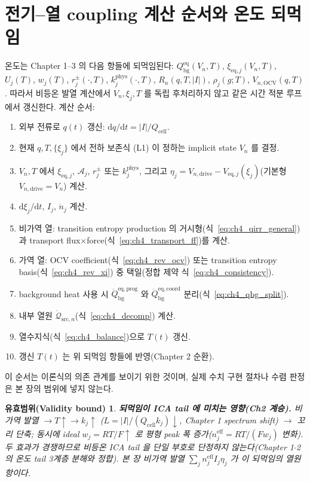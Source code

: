 \documentclass[11pt,a4paper]{article}
\newtheorem*{boundbox}{유효범위(Validity bound)}
\newcommand{\dd}{\mathrm{d}}
\newcommand{\eff}{\mathrm{eff}}
\newcommand{\eq}{\mathrm{eq}}
\newcommand{\drive}{\mathrm{drive}}
\newcommand{\bg}{\mathrm{bg}}
\newcommand{\cell}{\mathrm{cell}}
\newcommand{\OCV}{\mathrm{OCV}}
\newcommand{\src}{\mathrm{src}}
\newcommand{\prog}{\mathrm{prog}}
\newcommand{\coord}{\mathrm{coord}}
\begin{document}
\section{전기--열 coupling 계산 순서와 온도 되먹임}\label{sec:ch4_order}
온도는 Chapter 1--3 의 다음 항들에 되먹임된다: $Q_\bg^{\eq}(V_n,T)$, $\xi_{\eq,j}(V_n,T)$, $U_j(T)$, $w_j(T)$,
$r_j^\pm(\cdot,T)$, $k_j^{\mathrm{phys}}(\cdot,T)$, $R_n(q,T,|I|)$, $\rho_j(g;T)$, $V_{n,\OCV}(q,T)$. 따라서
비등온 발열 계산에서 $V_n,\xi_j,T$ 를 독립 후처리하지 않고 같은 시간 적분 루프에서 갱신한다.
계산 순서:
\begin{enumerate}[label=\arabic*),leftmargin=2.0em]
\item 외부 전류로 $q(t)$ 갱신: $\dd q/\dd t=|I|/Q_\cell$.
\item 현재 $q,T,\{\xi_j\}$ 에서 전하 보존식 (L1) 이 정하는 implicit state $V_n$ 를 결정.
\item $V_n,T$ 에서 $\xi_{\eq,j}$, $\mathcal A_j$, $r_j^\pm$ 또는 $k_j^{\mathrm{phys}}$, 그리고
  $\eta_j=V_{n,\drive}-V_{\eq,j}(\xi_j)$(기본형 $V_{n,\drive}=V_n$) 계산.
\item $\dd\xi_j/\dd t$, $I_j$, $\dot n_j$ 계산.
\item 비가역 열: transition entropy production 의 거시형(식~\eqref{eq:ch4_qirr_general})과
  transport flux$\times$force(식~\eqref{eq:ch4_transport_ff})를 계산.
\item 가역 열: OCV coefficient(식~\eqref{eq:ch4_rev_ocv}) 또는 transition entropy basis(식~\eqref{eq:ch4_rev_xi})
  중 택일(정합 제약 식~\eqref{eq:ch4_consistency}).
\item background heat 사용 시 $\dot Q_\bg^{\eq,\prog}$ 와 $\dot Q_\bg^{\eq,\coord}$ 분리(식~\eqref{eq:ch4_qbg_split}).
\item 내부 열원 $\dot{\mathcal Q}_{\src,n}$(식~\eqref{eq:ch4_decomp}) 계산.
\item 열수지식(식~\eqref{eq:ch4_balance})으로 $T(t)$ 갱신.
\item 갱신 $T(t)$ 는 위 되먹임 항들에 반영(Chapter 2 순환).
\end{enumerate}
이 순서는 이론식의 의존 관계를 보이기 위한 것이며, 실제 수치 구현 절차나 수렴 판정은 본 장의 범위에 넣지 않는다.
\begin{boundbox}
\textbf{되먹임이 ICA tail 에 미치는 영향(Ch2 계승).} 비가역 발열 $\to T\uparrow\to k_j\uparrow$
($L=|I|/(Q_\cell k_j)\downarrow$, Chapter 1 spectrum shift) $\to$ 꼬리 단축; 동시에 ideal $w_j=RT/F\uparrow$ 로
평형 peak 폭 증가($n_j^{\eff}=RT/(Fw_j)$ 변화). 두 효과가 경쟁하므로 비등온 ICA tail 을 단일 부호로 단정하지
않는다(Chapter 1$\cdot$2 의 온도 tail 3계층 분해와 정합). 본 장 비가역 발열 $\sum_j n_j^{\eff}I_j\eta_j$ 가
이 되먹임의 열원 항이다.
\end{boundbox}
\end{document}
